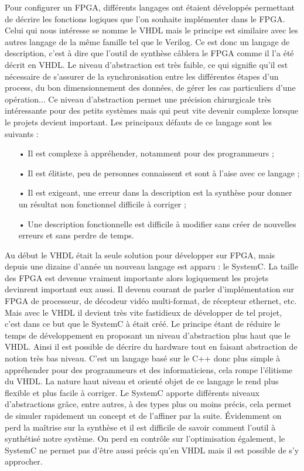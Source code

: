 \documentclass[a4paper,12pt]{article}
\begin{document}
Pour configurer un FPGA, différents langages ont étaient développés permettant de décrire les fonctions logiques que l'on souhaite implémenter dans le FPGA. Celui qui nous intéresse se nomme le VHDL mais le principe est similaire avec les autres langage de la même famille tel que le Verilog. Ce est donc un langage de description, c'est à dire que l'outil de synthèse câblera le FPGA comme il l'a été décrit en VHDL. Le niveau d'abstraction est très faible, ce qui signifie qu'il est nécessaire de s'assurer de la synchronisation entre les différentes étapes d'un process, du bon dimensionnement des données, de gérer les cas particuliers d'une opération... Ce niveau d'abstraction permet une précision chirurgicale très intéressante pour des petits systèmes mais qui peut vite devenir complexe lorsque le projets devient important. Les principaux défauts de ce langage sont les suivants :\newpage
\begin{itemize}
\item[•] Il est complexe à appréhender, notamment pour des programmeurs ;
\item[•] Il est élitiste, peu de personnes connaissent et sont à l'aise avec ce langage ;
\item[•] Il est exigeant, une erreur dans la description est la synthèse pour donner un résultat non fonctionnel difficile à corriger ;
\item[•] Une description fonctionnelle est difficile à modifier sans créer de nouvelles erreurs et sans perdre de temps.
\end{itemize}

Au début le VHDL était la seule solution pour développer sur FPGA, mais depuis une dizaine d'année un nouveau langage est apparu : le SystemC. La taille des FPGA est devenue vraiment importante alors logiquement les projets devinrent important eux aussi. Il devenu courant de parler d'implémentation sur FPGA de processeur, de décodeur vidéo multi-format, de récepteur ethernet, etc. Mais avec le VHDL il devient très vite fastidieux de développer de tel projet, c'est dans ce but que le SystemC à était créé. Le principe étant de réduire le temps de développement en proposant un niveau d'abstraction plus haut que le VHDL. Ainsi il est possible de décrire du hardware tout en faisant abstraction de notion très bas niveau. C'est un langage basé sur le C++ donc plus simple à appréhender pour des programmeurs et des informaticiens, cela rompe l'élitisme du VHDL. La nature haut niveau et orienté objet de ce langage le rend plus flexible et plus facile à corriger. Le SystemC apporte différents niveaux d'abstractions grâce, entre autres, à des types plus ou moins précis, cela permet de simuler rapidement un concept et de l'affiner par la suite. Évidemment on perd la maîtrise sur la synthèse et il est difficile de savoir comment l'outil à synthétisé notre système. On perd en contrôle sur l'optimisation également, le SystemC ne permet pas d'être aussi précis qu'en VHDL mais il est possible de s'y approcher. 
\end{document}

